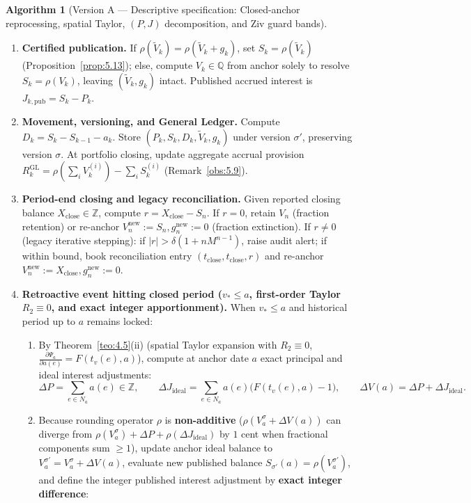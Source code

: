 \documentclass[11pt, a4paper]{article}
\theoremstyle{definition}
\newtheorem{algoritmo}[definicao]{Algorithm}
\theoremstyle{plain}
\theoremstyle{remark}
\begin{document}
\begin{algoritmo}[Version A — Descriptive specification: Closed-anchor reprocessing, spatial Taylor, \texorpdfstring{$(P, J)$}{(P, J)} decomposition, and Ziv guard bands]
\begin{enumerate}[label=\textbf{\arabic*.}]
\begin{itemize}
\[        \]
    \end{itemize}
    \item \textbf{Certified publication.} If $\rho(\tilde{V}_k) = \rho(\tilde{V}_k + g_k)$, set $S_k = \rho(\tilde{V}_k)$ (Proposition~\ref{prop:5.13}); else, compute $V_k \in \mathbb{Q}$ from anchor solely to resolve $S_k = \rho(V_k)$, leaving $(\tilde{V}_k, g_k)$ intact. Published accrued interest is $J_{k,\text{pub}} = S_k - P_k$.
    \item \textbf{Movement, versioning, and General Ledger.} Compute $D_k = S_k - S_{k-1} - a_k$. Store $(P_k, S_k, D_k, \tilde{V}_k, g_k)$ under version $\sigma'$, preserving version $\sigma$. At portfolio closing, update aggregate accrual provision $R_k^{\text{GL}} = \rho(\sum_i V_k^{(i)}) - \sum_i S_k^{(i)}$ (Remark~\ref{obs:5.9}).
    \item \textbf{Period-end closing and legacy reconciliation.} Given reported closing balance $X_{\text{close}} \in \mathbb{Z}$, compute $r = X_{\text{close}} - S_n$. If $r = 0$, retain $V_n$ (fraction retention) or re-anchor $V_n^{\text{new}} := S_n, g_n^{\text{new}} := 0$ (fraction extinction). If $r \neq 0$ (legacy iterative stepping): if $|r| > \delta(1 + n M^{n-1})$, raise audit alert; if within bound, book reconciliation entry $(t_{\text{close}}, t_{\text{close}}, r)$ and re-anchor $V_n^{\text{new}} := X_{\text{close}}, g_n^{\text{new}} := 0$.
    \item \textbf{Retroactive event hitting closed period (\texorpdfstring{$v_* \le a$}{v* <= a}, first-order Taylor \texorpdfstring{$R_2 \equiv 0$}{R2 = 0}, and exact integer apportionment).} When $v_* \le a$ and historical period up to $a$ remains locked:
    \begin{enumerate}[label=(\alph*)]
        \item By Theorem~\ref{teo:4.5}(ii) (spatial Taylor expansion with $R_2 \equiv 0$, $\frac{\partial \Psi_a}{\partial a(e)} = F(t_v(e), a)$), compute at anchor date $a$ exact principal and ideal interest adjustments:
        \[
        \Delta P = \sum_{e \in N_a} a(e) \in \mathbb{Z}, \qquad \Delta J_{\text{ideal}} = \sum_{e \in N_a} a(e)\big(F(t_v(e), a) - 1\big), \qquad \Delta V(a) = \Delta P + \Delta J_{\text{ideal}}.
        \]
        \item Because rounding operator $\rho$ is \textbf{non-additive} ($\rho(V_a^\sigma + \Delta V(a))$ can diverge from $\rho(V_a^\sigma) + \Delta P + \rho(\Delta J_{\text{ideal}})$ by $1$ cent when fractional components sum $\ge 1$), update anchor ideal balance to $V_a^{\sigma'} = V_a^\sigma + \Delta V(a)$, evaluate new published balance $S_{\sigma'}(a) = \rho(V_a^{\sigma'})$, and define the integer published interest adjustment by \textbf{exact integer difference}:

\end{enumerate}
\end{enumerate}
\end{algoritmo}
\end{document}
